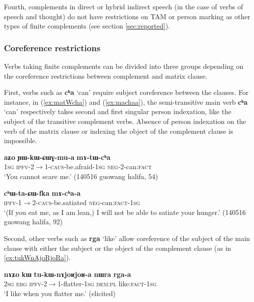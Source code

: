 \documentclass[oneside,a4paper,11pt]{article}
\newcommand{\ipa}[1]{\textbf{\phon#1}} %
\newcommand{\jpg}[2]{\ipa{#1} `#2'} %
\begin{document}
Fourth, complements in direct or hybrid indirect speech (in the case of verbs of speech and thought) do not have restrictions on TAM or person marking as other types of finite complements (see section \ref{sec:reported}).

\subsubsection{Coreference restrictions} \label{sec:finitie.coref}
Verbs taking finite complements can be divided into three groups depending on the coreference restrictions between complement and matrix clause.

First, verbs such as \jpg{cʰa}{can} require subject coreference between the clauses. For instance, in (\ref{ex:matWcha}) and (\ref{ex:machaa}), the semi-transitive main verb \jpg{cʰa}{can} respectively takes second and first singular person indexation, like the subject of the transitive complement verbs. Absence of person indexation on the verb of the matrix clause or indexing the object of the complement clause is impossible.

\begin{exe}
\ex \label{ex:matWcha}
\gll \ipa{aʑo} 	\ipa{ɲɯ-kɯ-ɕɯɣ-mu-a} 	\ipa{mɤ-tɯ-cʰa} \\
\textsc{1sg} \textsc{ipfv-2$\rightarrow$1-caus}-be.afraid-\textsc{1sg} \textsc{neg}-2-can:\textsc{fact} \\
\glt `You cannot scare me.' (140516 guowang halifa, 54)
\end{exe}

\begin{exe}
\ex \label{ex:machaa}
\gll
\ipa{cʰɯ-ta-ɕɯ-fka} 	\ipa{mɤ-cʰa-a} \\
\textsc{ipfv-1$\rightarrow$2-caus}-be.satiated \textsc{neg}-can:\textsc{fact-1sg} \\
\glt `(If you eat me, as I am lean,) I will not be able to satiate your hunger.' (140516 guowang halifa, 92)
\end{exe}

Second, other verbs such as \jpg{rga}{like} allow coreference of the subject of the main clause with either the subject or the object of the complement clause (as in \ref{ex:tukWnAjoRjoRa}).

\begin{exe}
\ex \label{ex:tukWnAjoRjoRa}
\gll \ipa{nɤʑo} \ipa{kɯ} \ipa{tu-kɯ-nɤjoʁjoʁ-a} \ipa{nɯra}	\ipa{rga-a} \\
\textsc{2sg} \textsc{erg} \textsc{ipfv}-2$\rightarrow$1-flatter-\textsc{1sg} \textsc{dem:pl} like:\textsc{fact-1sg} \\
\glt `I like when you flatter me.' (elicited)
\end{exe}
\end{document}
